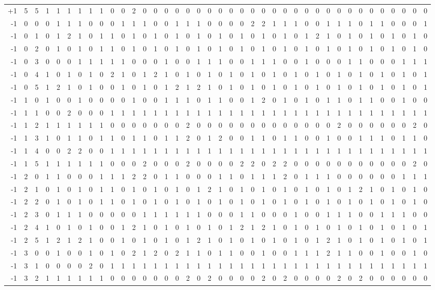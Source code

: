 {\begin{longtable}{rrr|rrrrrr|rrrrrr|rrrrrr|rrrrrr|rrrrrr|rrrrrr}
+1&5&5&1&1&1&1&1&1&0&0&2&0&0&0&0&0&0&0&0&0&0&0&0&0&0&0&0&0&0&0&0&0&0&0&0&0&0&0\\
-1&0&0&0&1&1&1&0&0&0&1&1&1&0&0&1&1&1&0&0&0&0&2&2&1&1&1&0&0&1&1&1&0&1&1&0&0&0&1\\
-1&0&1&0&1&2&1&0&1&1&0&1&0&1&0&1&0&1&0&1&0&1&0&1&0&1&0&1&2&1&0&1&0&1&0&1&0&1&0\\
-1&0&2&0&1&0&1&0&1&1&0&1&0&1&0&1&0&1&0&1&0&1&0&1&0&1&0&1&0&1&0&1&0&1&0&1&0&1&0\\
-1&0&3&0&0&0&1&1&1&1&1&0&0&0&1&0&0&1&1&1&0&0&1&1&1&0&0&1&0&0&0&1&1&0&0&0&1&1&1\\
-1&0&4&1&0&1&0&1&0&2&1&0&1&2&1&0&1&0&1&0&1&0&1&0&1&0&1&0&1&0&1&0&1&0&1&0&1&0&1\\
-1&0&5&1&2&1&0&1&0&0&1&0&1&0&1&2&1&2&1&0&1&0&1&0&1&0&1&0&1&0&1&0&1&0&1&0&1&0&1\\
-1&1&0&1&0&0&1&0&0&0&0&1&0&0&1&1&1&0&1&1&0&0&1&2&0&1&0&1&0&1&1&0&1&1&0&0&1&0&0\\
-1&1&1&0&0&2&0&0&0&1&1&1&1&1&1&1&1&1&1&1&1&1&1&1&1&1&1&1&1&1&1&1&1&1&1&1&1&1&1\\
-1&1&2&1&1&1&1&1&1&0&0&0&0&0&0&0&2&0&0&0&0&0&0&0&0&0&0&0&0&0&2&0&0&0&0&0&0&2&0\\
-1&1&3&1&0&1&1&0&1&1&0&1&1&0&1&1&2&0&1&2&0&0&1&1&0&1&1&0&0&1&0&0&1&1&1&0&1&1&0\\
-1&1&4&0&0&2&2&0&0&1&1&1&1&1&1&1&1&1&1&1&1&1&1&1&1&1&1&1&1&1&1&1&1&1&1&1&1&1&1\\
-1&1&5&1&1&1&1&1&1&0&0&0&2&0&0&0&2&0&0&0&0&2&2&0&2&2&0&0&0&0&0&0&0&0&0&0&0&2&0\\
-1&2&0&1&1&0&0&0&1&1&1&2&2&0&1&1&0&0&0&1&1&0&1&1&1&2&0&1&1&1&0&0&0&0&0&0&1&1&1\\
-1&2&1&0&1&0&1&0&1&1&0&1&0&1&0&1&0&1&2&1&0&1&0&1&0&1&0&1&0&1&0&1&2&1&0&1&0&1&0\\
-1&2&2&0&1&0&1&0&1&1&0&1&0&1&0&1&0&1&0&1&0&1&0&1&0&1&0&1&0&1&0&1&0&1&0&1&0&1&0\\
-1&2&3&0&1&1&1&0&0&0&0&0&1&1&1&1&1&1&0&0&0&1&1&0&0&0&1&0&0&1&1&1&0&0&1&1&1&0&0\\
-1&2&4&1&0&1&0&1&0&0&1&2&1&0&1&0&1&0&1&0&1&2&1&2&1&0&1&0&1&0&1&0&1&0&1&0&1&0&1\\
-1&2&5&1&2&1&2&1&0&0&1&0&1&0&1&0&1&2&1&0&1&0&1&0&1&0&1&0&1&2&1&0&1&0&1&0&1&0&1\\
-1&3&0&0&1&0&0&1&0&1&0&2&1&2&0&2&1&1&0&1&1&0&0&1&0&0&1&1&1&2&1&1&0&0&1&0&0&1&0\\
-1&3&1&0&0&0&0&2&0&1&1&1&1&1&1&1&1&1&1&1&1&1&1&1&1&1&1&1&1&1&1&1&1&1&1&1&1&1&1\\
-1&3&2&1&1&1&1&1&1&0&0&0&0&0&0&0&2&0&2&0&0&0&0&2&0&2&0&0&0&0&2&0&2&0&0&0&0&0&0\\

\end{longtable}}
